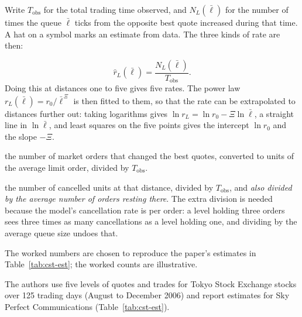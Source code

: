 Write $T_{\text{obs}}$ for the total trading time observed, and $N_L(\bar\ell)$ for the number of times
the queue $\bar\ell$ ticks from the opposite best quote increased during that time. A hat on a symbol
marks an estimate from data. The three kinds of rate are then:
\begin{description}[leftmargin=1.5em,style=nextline,itemsep=3pt]
\item[Limit orders, at each distance]
  \[
    \widehat{r}_L(\bar\ell) = \frac{N_L(\bar\ell)}{T_{\text{obs}}}.
  \]
  Doing this at distances one to five gives five rates. The power law $r_L(\bar\ell) =
  r_0/\bar\ell^{\,\Xi}$ is then fitted to them, so that the rate can be extrapolated to distances further
  out: taking logarithms gives $\ln r_L = \ln r_0 - \Xi \ln \bar\ell$, a straight line in $\ln \bar\ell$,
  and least squares on the five points gives the intercept $\ln r_0$ and the slope $-\Xi$.
\item[Market orders] the number of market orders that changed the best quotes, converted to units of
  the average limit order, divided by $T_{\text{obs}}$. 
\item[Cancellations, at each distance] the number of cancelled units at that distance, divided by
  $T_{\text{obs}}$, and \emph{also divided by the average number of orders resting there}. The extra
  division is needed because the model's cancellation rate is per order: a level holding three orders
  sees three times as many cancellations as a level holding one, and dividing by the average queue size
  undoes that. 
\end{description}
The worked numbers are chosen to reproduce the paper's estimates in Table~\ref{tab:cst-est}; the worked
counts are illustrative.

The authors use five levels of quotes and trades for Tokyo Stock Exchange
stocks over 125 trading days (August to December 2006) and report estimates for Sky Perfect
Communications (Table~\ref{tab:cst-est}).

